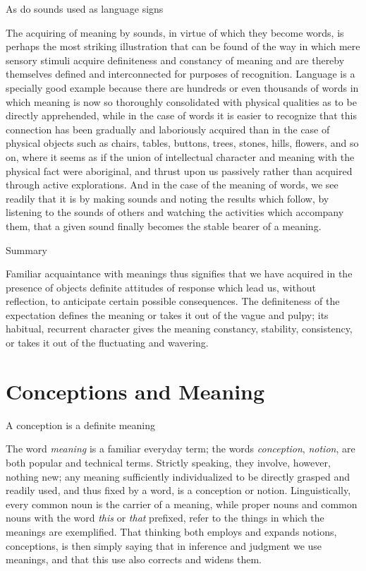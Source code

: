 \documentclass[letterpaper]{book}
\begin{document}
As do sounds used as language signs

The acquiring of meaning by sounds, in virtue of which they become
words, is perhaps the most striking illustration that can be found of
the way in which mere sensory stimuli acquire definiteness and constancy
of meaning and are thereby themselves defined and interconnected for
purposes of recognition. Language is a specially good example because
there are hundreds or even thousands of words in which meaning is now so
thoroughly consolidated with physical qualities as to be directly
apprehended, while in the case of words it is easier to recognize that
this connection has been gradually and laboriously acquired than in the
case of physical objects such as chairs, tables, buttons, trees, stones,
hills, flowers, and so on, where it seems as if the union of
intellectual character and meaning with the physical fact were
aboriginal, and thrust upon us passively rather than acquired through
active explorations. And in the case of the meaning of words, we see
readily that it is by
making
sounds and noting the results which follow, by listening to the sounds
of others and watching the activities which accompany them, that a given
sound finally becomes the stable bearer of a meaning.

Summary

Familiar acquaintance with meanings thus signifies that we have acquired
in the presence of objects definite attitudes of response which lead us,
without reflection, to anticipate certain possible consequences. The
definiteness of the expectation defines the meaning or takes it out of
the vague and pulpy; its habitual, recurrent character gives the meaning
constancy, stability, consistency, or takes it out of the fluctuating
and wavering.

\section{Conceptions and Meaning}

A conception is a definite meaning

The word \emph{meaning} is a familiar everyday term; the words
\emph{conception}, \emph{notion}, are both popular and technical terms.
Strictly speaking, they involve, however, nothing new; any meaning
sufficiently individualized to be directly grasped and readily used, and
thus fixed by a word, is a conception or notion. Linguistically, every
common noun is the carrier of a meaning, while proper nouns and common
nouns with the word \emph{this} or \emph{that} prefixed, refer to the
things in which the meanings are exemplified. That thinking both employs
and expands notions, conceptions, is then simply saying that in
inference and judgment we use meanings, and that this use also corrects
and widens them.
\end{document}
